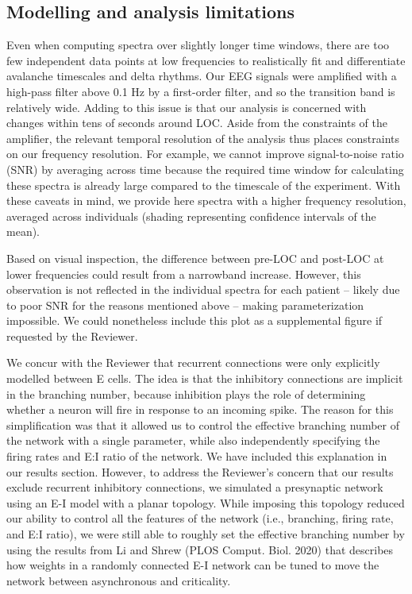 \subsection{Modelling and analysis limitations}
Even when computing spectra over slightly longer time windows, there are too few independent data points at low frequencies to realistically fit and differentiate avalanche timescales and delta rhythms. Our EEG signals were amplified with a high-pass filter above 0.1 Hz by a first-order filter, and so the transition band is relatively wide. Adding to this issue is that our analysis is concerned with changes within tens of seconds around LOC. Aside from the constraints of the amplifier, the relevant temporal resolution of the analysis thus places constraints on our frequency resolution. For example, we cannot improve signal-to-noise ratio (SNR) by averaging across time because the required time window for calculating these spectra is already large compared to the timescale of the experiment.
 With these caveats in mind, we provide here spectra with a higher frequency resolution, averaged across individuals (shading representing confidence intervals of the mean).

Based on visual inspection, the difference between pre-LOC and post-LOC at lower frequencies could result from a narrowband increase. However, this observation is not reflected in the individual spectra for each patient – likely due to poor SNR for the reasons mentioned above – making parameterization impossible. We could nonetheless include this plot as a supplemental figure if requested by the Reviewer.


We concur with the Reviewer that recurrent connections were only explicitly modelled between E cells. The idea is that the inhibitory connections are implicit in the branching number, because inhibition plays the role of determining whether a neuron will fire in response to an incoming spike. The reason for this simplification was that it allowed us to control the effective branching number of the network with a single parameter, while also independently specifying the firing rates and E:I ratio of the network. We have included this explanation in our results section. However, to address the Reviewer’s concern that our results exclude recurrent inhibitory connections, we simulated a presynaptic network using an E-I model with a planar topology. While imposing this topology reduced our ability to control all the features of the network (i.e., branching, firing rate, and E:I ratio), we were still able to roughly set the effective branching number by using the results from Li and Shrew (PLOS Comput. Biol. 2020) that describes how weights in a randomly connected E-I network can be tuned to move the network between asynchronous and criticality.

